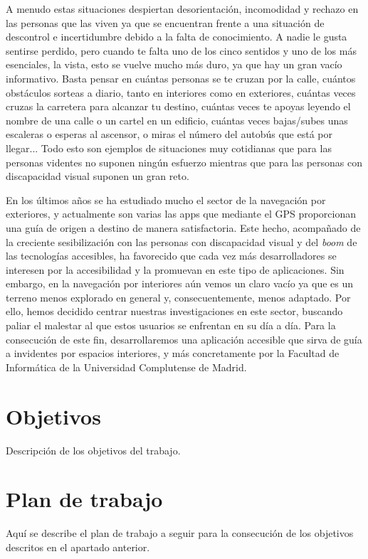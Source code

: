 A menudo estas situaciones despiertan desorientación, incomodidad y rechazo en las personas que las viven ya que se encuentran frente a una situación de descontrol e incertidumbre debido a la falta de conocimiento. A nadie le gusta sentirse perdido, pero cuando te falta uno de los cinco sentidos y uno de los más esenciales, la vista, esto se vuelve mucho más duro, ya que hay un gran vacío informativo. Basta pensar en cuántas personas se te cruzan por la calle, cuántos obstáculos sorteas a diario, tanto en interiores como en exteriores, cuántas veces cruzas la carretera para alcanzar tu destino, cuántas veces te apoyas leyendo el nombre de una calle o un cartel en un edificio, cuántas veces bajas/subes unas escaleras o esperas al ascensor, o miras el número del autobús que está por llegar... Todo esto son ejemplos de situaciones muy cotidianas que para las personas videntes no suponen ningún esfuerzo mientras que para las personas con discapacidad visual suponen un gran reto. 

En los últimos años se ha estudiado mucho el sector de la navegación por exteriores, y actualmente son varias las apps que mediante el GPS proporcionan una guía de origen a destino de manera satisfactoria. Este hecho, acompañado de la creciente sesibilización con las personas con discapacidad visual y del \textit{boom} de las tecnologías accesibles, ha favorecido que cada vez más desarrolladores se interesen por la accesibilidad y la promuevan en este tipo de aplicaciones. Sin embargo, en la navegación por interiores aún vemos un claro vacío ya que es un terreno menos explorado en general y, consecuentemente, menos adaptado. Por ello, hemos decidido centrar nuestras investigaciones en este sector, buscando paliar el malestar al que estos usuarios se enfrentan en su día a día. Para la consecución de este fin, desarrollaremos una aplicación accesible que sirva de guía a invidentes por espacios interiores, y más concretamente por la Facultad de Informática de la Universidad Complutense de Madrid.


\section{Objetivos}

Descripción de los objetivos del trabajo.


\section{Plan de trabajo}
Aquí se describe el plan de trabajo a seguir para la consecución de los objetivos descritos en el apartado anterior.



